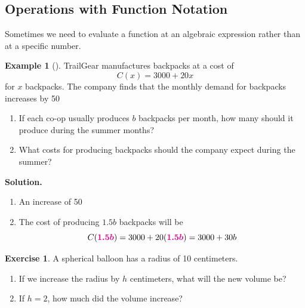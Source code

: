 \documentclass[10pt,]{book}
\theoremstyle{plain}
\theoremstyle{definition}
\theoremstyle{definition}
\newtheorem{example}[theorem]{Example}
\theoremstyle{definition}
\newtheorem{exercise}[theorem]{Exercise}
\newcommand{\alert}[1]{\boldsymbol{\color{magenta}{#1}}}
\begin{document}
\subsection[{Operations with Function Notation}]{Operations with Function Notation}\label{subsection-7}
Sometimes we need to evaluate a function at an algebraic expression rather than at a specific number.%
\begin{example}[]\label{example-backpacks}
TrailGear manufactures backpacks at a cost of%
\begin{equation*}
C(x) = 3000 + 20x
\end{equation*}
for \(x\) backpacks. The company finds that the monthly demand for backpacks increases by 50%
\leavevmode%
\begin{enumerate}[label=\alph*]
\item\hypertarget{li-45}{}If each co-op usually produces \(b\) backpacks per month, how many should it produce during the summer months?%
\item\hypertarget{li-46}{}What costs for producing backpacks should the company expect during the summer?%
\end{enumerate}
\par\medskip\noindent%
\textbf{Solution.}\quad \leavevmode%
\begin{enumerate}[label=\alph*]
\item\hypertarget{li-47}{}An increase of 50%
\item\hypertarget{li-48}{}The cost of producing \(1.5b\) backpacks will be%
\begin{equation*}
C(\alert{1.5b}) = 3000 + 20(\alert{1.5b}) = 3000 + 30b
\end{equation*}
%
\end{enumerate}
\end{example}
\begin{exercise}\label{exercise-spherical-balloon}
A spherical balloon has a radius of 10 centimeters. \leavevmode%
\begin{enumerate}[label=\alph*]
\item\hypertarget{li-49}{}If we increase the radius by \(h\) centimeters, what will the new volume be?%
\item\hypertarget{li-50}{}If \(h = 2\), how much did the volume increase?%
\end{enumerate}
\end{exercise}
\end{document}
